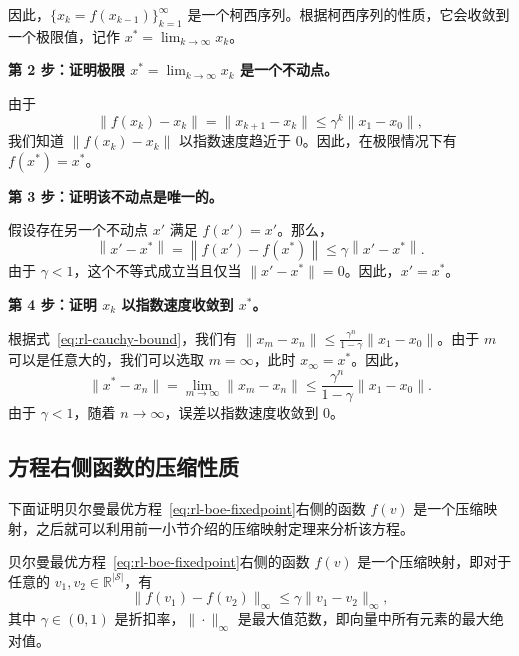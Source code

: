 \begin{derivation}[方框 3.1：压缩映射定理的证明]
因此，$\{x_k = f(x_{k-1})\}_{k=1}^{\infty}$ 是一个柯西序列。根据柯西序列的性质，它会收敛到一个极限值，记作 $x^* = \lim_{k \to \infty} x_k$。

\textbf{第 2 步：证明极限 $x^* = \lim_{k \to \infty} x_k$ 是一个不动点。}

由于
\begin{equation}
  \| f(x_k) - x_k \| = \| x_{k+1} - x_k \| \leqslant \gamma^k \| x_1 - x_0 \|,
\end{equation}
我们知道 $\|f(x_k) - x_k\|$ 以指数速度趋近于 0。因此，在极限情况下有 $f(x^*) = x^*$。

\textbf{第 3 步：证明该不动点是唯一的。}

假设存在另一个不动点 $x'$ 满足 $f(x') = x'$。那么，
\begin{equation}
  \left\| x' - x^* \right\| = \left\| f(x') - f(x^*) \right\| \leqslant \gamma \left\| x' - x^* \right\|.
\end{equation}
由于 $\gamma < 1$，这个不等式成立当且仅当 $\|x' - x^*\| = 0$。因此，$x' = x^*$。

\textbf{第 4 步：证明 $x_k$ 以指数速度收敛到 $x^*$。}

根据式~\eqref{eq:rl-cauchy-bound}，我们有 $\|x_m - x_n\| \leqslant \frac{\gamma^n}{1 - \gamma} \|x_1 - x_0\|$。由于 $m$ 可以是任意大的，我们可以选取 $m = \infty$，此时 $x_\infty = x^*$。因此，
\begin{equation}
  \| x^* - x_n \| = \lim_{m \to \infty} \| x_m - x_n \| \leqslant \frac{\gamma^n}{1 - \gamma} \| x_1 - x_0 \|.
\end{equation}
由于 $\gamma < 1$，随着 $n \to \infty$，误差以指数速度收敛到 0。
\end{derivation}

\subsection{方程右侧函数的压缩性质}
\label{sec:rl-bellman-opt-fcontraction}

下面证明贝尔曼最优方程~\eqref{eq:rl-boe-fixedpoint}右侧的函数 $f(v)$ 是一个压缩映射，之后就可以利用前一小节介绍的压缩映射定理来分析该方程。

\begin{theorem}[$f(v)$ 的压缩性质]
\label{thm:rl-fv-contraction}
贝尔曼最优方程~\eqref{eq:rl-boe-fixedpoint}右侧的函数 $f(v)$ 是一个压缩映射，即对于任意的 $v_1, v_2 \in \mathbb{R}^{|\mathcal{S}|}$，有
\begin{equation}
  \| f(v_1) - f(v_2) \|_\infty \leqslant \gamma \| v_1 - v_2 \|_\infty,
\end{equation}
其中 $\gamma \in (0,1)$ 是折扣率，$\| \cdot \|_\infty$ 是最大值范数，即向量中所有元素的最大绝对值。
\end{theorem}

